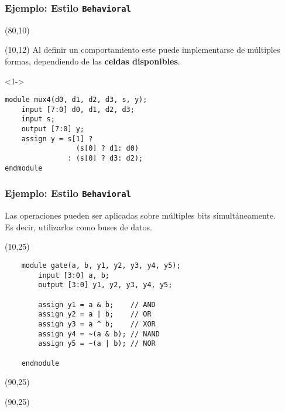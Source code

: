 \documentclass[aspectratio=169]{beamer}
\begin{document}
\begin{frame}[fragile,t]
    \frametitle{Ejemplo: Estilo \texttt{Behavioral}}
    \begin{textblock}{70}(80,10)
    \end{textblock}
    \begin{textblock}{65}(10,12)
    Al definir un comportamiento este puede implementarse de múltiples formas, dependiendo de las \textbf{celdas disponibles}.
    \bigskip
    \begin{onlyenv}<1->
\begin{lstlisting}
module mux4(d0, d1, d2, d3, s, y);
    input [7:0] d0, d1, d2, d3;
    input s;
    output [7:0] y;
    assign y = s[1] ?
                 (s[0] ? d1: d0) 
               : (s[0] ? d3: d2);
endmodule
\end{lstlisting}
    \end{onlyenv}
    \end{textblock}
\end{frame}

\begin{frame}[fragile,t]
    \frametitle{Ejemplo: Estilo \texttt{Behavioral}}
    Las operaciones pueden ser aplicadas sobre múltiples bits simultáneamente.\\
    Es decir, utilizarlos como buses de datos.
    \begin{textblock}{80}(10,25)
\begin{lstlisting}
    module gate(a, b, y1, y2, y3, y4, y5);
        input [3:0] a, b;
        output [3:0] y1, y2, y3, y4, y5;

        assign y1 = a & b;    // AND
        assign y2 = a | b;    // OR
        assign y3 = a ^ b;    // XOR
        assign y4 = ~(a & b); // NAND
        assign y5 = ~(a | b); // NOR

    endmodule
\end{lstlisting}
    \end{textblock}
    \begin{textblock}{60}(90,25) \begin{center}  \end{center} \end{textblock}
    \begin{textblock}{60}(90,25) \begin{center}  \end{center} \end{textblock}
\end{frame}
\end{document}
